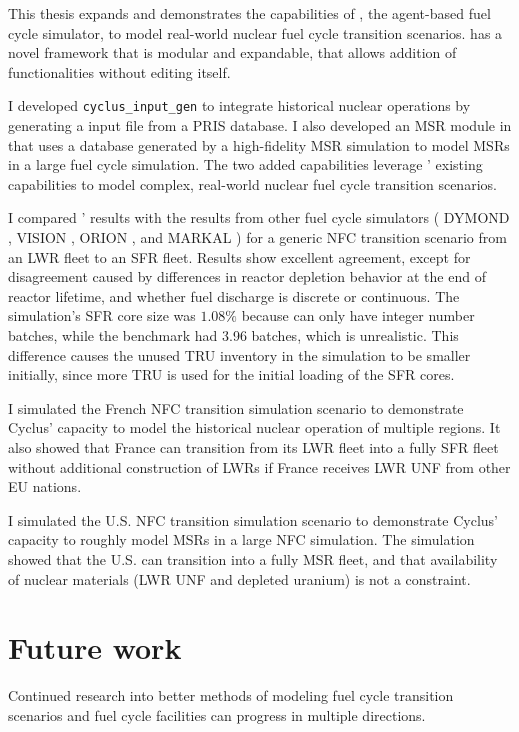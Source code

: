 This thesis expands and demonstrates the capabilities of \Cyclus, the agent-based
fuel cycle simulator, to model real-world nuclear fuel cycle
transition scenarios. \Cyclus has a novel framework that is
modular and expandable, that allows addition of functionalities
without editing \Cyclus itself.

I developed \texttt{cyclus\_input\_gen}
to integrate historical nuclear operations by generating
a \Cyclus input file from a \gls{PRIS} database. I also
developed an \gls{MSR} module in \Cyclus that uses a database
generated by a high-fidelity \gls{MSR} simulation to model
\glspl{MSR} in a large fuel cycle simulation. The two
added capabilities leverage \Cyclus' existing capabilities
to model complex, real-world nuclear fuel cycle transition
scenarios.

I compared \Cyclus' results with
the results from other fuel cycle simulators
(
DYMOND \cite{yacout_modeling_2005},
VISION \cite{jacobson_verifiable_2010},
ORION \cite{gregg_analysis_2012}, and
MARKAL \cite{shay_epa_2006}
) for a generic \gls{NFC} transition scenario from an
\gls{LWR} fleet to an \gls{SFR} fleet. Results show
excellent agreement, except for disagreement caused 
by differences in reactor depletion
behavior at the end of reactor lifetime, and
whether fuel discharge is discrete or continuous.
The \Cyclus simulation's \gls{SFR} core size was
$1.08\%$ because \Cyclus can only have integer
number batches, while the benchmark had 3.96
batches, which is unrealistic. This difference
causes the unused \gls{TRU} inventory in the \Cyclus
simulation to be smaller initially, since more
\gls{TRU} is used for the initial loading of the \gls{SFR}
cores. 

I simulated the French \gls{NFC} transition simulation scenario
to demonstrate
Cyclus' capacity to model the historical nuclear operation
of multiple regions. It also showed that
France can transition from its \gls{LWR} fleet into a fully \gls{SFR} fleet
without additional construction of \glspl{LWR} if France receives
\gls{LWR} \gls{UNF} from other \gls{EU} nations.

I simulated the U.S. \gls{NFC} transition simulation scenario
to demonstrate
Cyclus' capacity to roughly model \glspl{MSR} in
a large \gls{NFC} simulation. The simulation showed
that the U.S. can transition into a fully
\gls{MSR} fleet, and that availability of nuclear materials
(\gls{LWR} \gls{UNF} and depleted uranium) is not a constraint.



\section{Future work}
Continued research into better methods of modeling fuel cycle
transition scenarios and fuel cycle facilities can progress
in multiple directions. 

